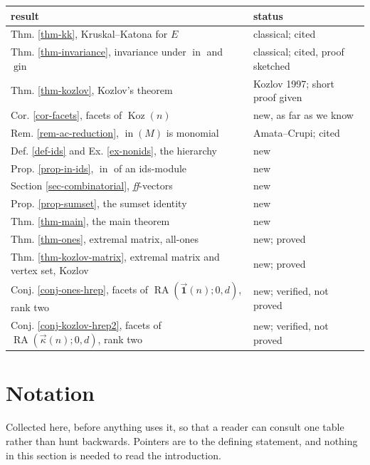 \documentclass[11pt, a4paper, abstract=yes]{scrartcl}
\theoremstyle{definition}
\theoremstyle{remark}
\theoremstyle{plain}
\newcommand{\Koz}{\operatorname{Koz}}
\newcommand{\RA}{\operatorname{RA}}
\newcommand{\kozvec}{\vec\kappa}
\newcommand{\onesvec}{\vec{\mathbf 1}}
\newcommand{\inn}{\operatorname{in}}
\newcommand{\gin}{\operatorname{gin}}
\begin{document}
\begin{center}
\small
\begin{tabular}{ll}
result & status\\
\hline
Thm. \ref{thm-kk}, Kruskal--Katona for \(E\) & classical; cited\\
Thm. \ref{thm-invariance}, invariance under \(\inn\) and \(\gin\) & classical; cited, proof sketched\\
Thm. \ref{thm-kozlov}, Kozlov's theorem & Kozlov 1997; short proof given\\
Cor. \ref{cor-facets}, facets of \(\Koz(n)\) & new, as far as we know\\
Rem. \ref{rem-ac-reduction}, \(\inn(M)\) is monomial & Amata--Crupi; cited\\
Def. \ref{def-ids} and Ex. \ref{ex-nonids}, the hierarchy & new\\
Prop. \ref{prop-in-ids}, \(\inn\) of an ids-module & new\\
Section \ref{sec-combinatorial}, \emph{ff}-vectors & new\\
Prop. \ref{prop-sumset}, the sumset identity & new\\
Thm. \ref{thm-main}, the main theorem & new\\
Thm. \ref{thm-ones}, extremal matrix, all-ones & new; proved\\
Thm. \ref{thm-kozlov-matrix}, extremal matrix and vertex set, Kozlov & new; proved\\
Conj. \ref{conj-ones-hrep}, facets of \(\RA(\onesvec(n);0,d)\), rank two & new; verified, not proved\\
Conj. \ref{conj-kozlov-hrep2}, facets of \(\RA(\kozvec(n);0,d)\), rank two & new; verified, not proved\\
\end{tabular}
\end{center}
\section{Notation}
\label{sec-notation}
Collected here, before anything uses it, so that a reader can consult one table rather than hunt
backwards. Pointers are to the defining statement, and nothing in this section is needed to read
the introduction.
\end{document}
